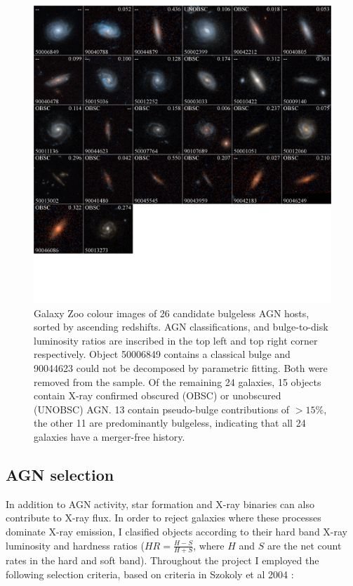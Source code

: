 \documentclass[11pt,twocolumn]{article}
\begin{document}
\begin{figure}[!t]
\includegraphics[width=\textwidth]{Mosaic2}
\caption{ Galaxy Zoo \cite{2013MSAIS..25...82M} colour images of 26 candidate bulgeless AGN hosts, sorted by ascending redshifts. AGN classifications, and bulge-to-disk luminosity ratios are inscribed in the top left and top right corner respectively. Object 50006849 contains a classical bulge and 90044623 could not be decomposed by parametric fitting. Both were removed from the sample. Of the remaining 24 galaxies, 15 objects contain X-ray confirmed obscured (OBSC) or unobscured (UNOBSC) AGN. 13 contain pseudo-bulge contributions of $>15\%$, the other 11 are predominantly bulgeless, indicating that all 24 galaxies have a merger-free history.}
\label{mosaic}
\vspace{-7em}
\end{figure}
\vspace{-1em}


\subsection{AGN selection} 
In addition to AGN activity, star formation and X-ray binaries can also contribute to X-ray flux. In order to reject galaxies where these processes dominate X-ray emission, I clasified objects according to their hard band X-ray luminosity and hardness ratios ($ HR =  \frac{H -S}{H+S}$, where $H$ and $S$ are the net count rates in the hard  and soft band). Throughout the project I employed the following selection criteria, based on criteria in Szokoly et al 2004 \cite{2004ApJS..155..271S}:
%
\end{document}
